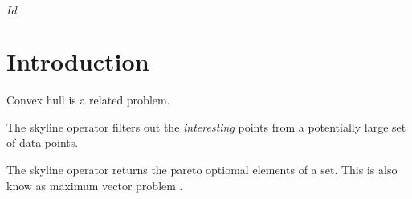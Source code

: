 
\svnInfo $Id$

\chapter{Introduction\revision}
\label{chap:Introduction}
Convex hull is a related problem.

The skyline operator \citep{BKS2001} filters out the \emph{interesting} points from a potentially large set of data points.


The skyline operator returns the pareto optiomal elements of a set. This is also know as maximum vector problem \citep{BKS2001}.




